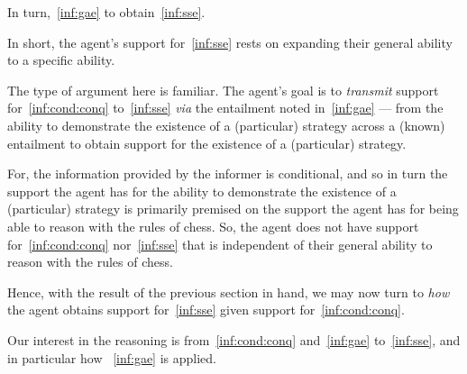 \documentclass[10pt]{article}
\begin{document}
\begin{note}
  In turn,~\ref{inf:gae} to obtain~\ref{inf:sse}.

  In short, the agent's support for~\ref{inf:sse} rests on expanding their general ability to a specific ability.

  The type of argument here is familiar.
  The agent's goal is to \emph{transmit} support for~\ref{inf:cond:conq} to~\ref{inf:sse} \emph{via} the entailment noted in~\ref{inf:gae} --- from the ability to demonstrate the existence of a (particular) strategy across a (known) entailment to obtain support for the existence of a (particular) strategy.

  For, the information provided by the informer is conditional, and so in turn the support the agent has for the ability to demonstrate the existence of a (particular) strategy is primarily premised on the support the agent has for being able to reason with the rules of chess.
  So, the agent does not have support for~\ref{inf:cond:conq} nor~\ref{inf:sse} that is independent of their general ability to reason with the rules of chess.

  Hence, with the result of the previous section in hand, we may now turn to \emph{how} the agent obtains support for~\ref{inf:sse} given support for~\ref{inf:cond:conq}.

   Our interest in the reasoning is from~\ref{inf:cond:conq} and~\ref{inf:gae} to~\ref{inf:sse}, and in particular how ~\ref{inf:gae} is applied.
\end{note}
\end{document}
